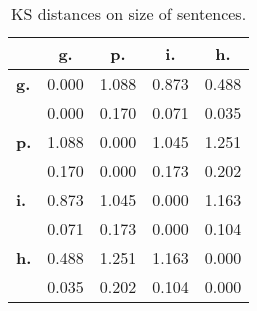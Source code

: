 \begin{table}[h!]
\begin{center}
\begin{tabular}{| l || c | c | c | c |}\hline
 & {\bf g.} & {\bf p.} & {\bf i.} & {\bf h.} \\\hline\hline
{\bf g.} & 0.000 & 1.088 & 0.873 & 0.488 \\
{\bf } & 0.000 & 0.170 & 0.071 & 0.035 \\\hline
{\bf p.} & 1.088 & 0.000 & 1.045 & 1.251 \\
{\bf } & 0.170 & 0.000 & 0.173 & 0.202 \\\hline
{\bf i.} & 0.873 & 1.045 & 0.000 & 1.163 \\
{\bf } & 0.071 & 0.173 & 0.000 & 0.104 \\\hline
{\bf h.} & 0.488 & 1.251 & 1.163 & 0.000 \\
{\bf } & 0.035 & 0.202 & 0.104 & 0.000 \\\hline
\end{tabular}
\caption{KS distances on size of sentences.}
\end{center}
\end{table}